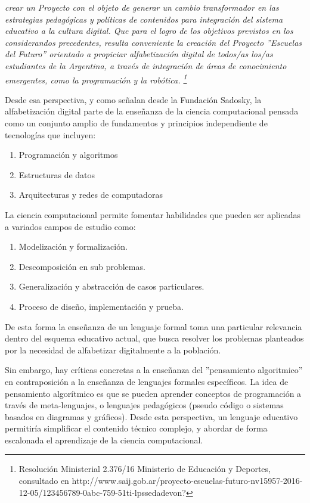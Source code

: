 \begin{center}
\textit{
crear un Proyecto con el objeto de generar un cambio transformador en las estrategias pedagógicas y políticas de contenidos para integración del sistema educativo a la cultura digital.
Que para el logro de los objetivos previstos en los considerandos precedentes, resulta conveniente la creación del Proyecto ''Escuelas del Futuro'' orientado a propiciar alfabetización digital de todos/as los/as estudiantes de la Argentina, a través de integración de áreas de conocimiento emergentes, como la programación y la robótica. \footnote{Resolución Ministerial 2.376/16 Ministerio de Educación y Deportes, consultado en http://www.saij.gob.ar/proyecto-escuelas-futuro-nv15957-2016-12-05/123456789-0abc-759-51ti-lpssedadevon?}
} 
\end{center}

Desde esa perspectiva, y como señalan desde la Fundación Sadosky, la alfabetización digital parte de la enseñanza de la ciencia computacional  pensada como un conjunto amplio de fundamentos y principios independiente de tecnologías  \citep[pág 12]{sadosky2013cc} que incluyen:

\begin{enumerate}
  \item Programación y algoritmos
  \item Estructuras de datos
  \item Arquitecturas y redes de computadoras
\end{enumerate}

La ciencia computacional permite fomentar habilidades que pueden ser aplicadas a variados campos de estudio como:

\begin{enumerate}
  \item Modelización y formalización.
  \item Descomposición en sub problemas.
  \item Generalización y abstracción de casos particulares.
  \item Proceso de diseño, implementación y prueba.
\end{enumerate}

De esta forma la enseñanza de un lenguaje formal toma una particular relevancia dentro del esquema educativo actual, que busca resolver los problemas planteados por la necesidad de alfabetizar digitalmente a la población.

Sin embargo, hay críticas concretas a la enseñanza del ''pensamiento algoritmico'' en contraposición a la enseñanza de lenguajes formales específicos. La idea de pensamiento algorítmico es que se pueden aprender conceptos de programación a través de meta-lenguajes, o lenguajes pedagógicos (pseudo código o sistemas basados en diagramas y gráficos). Desde esta perspectiva, un lenguaje educativo permitiría simplificar el contenido técnico complejo, y abordar de forma escalonada el aprendizaje de la ciencia computacional.

